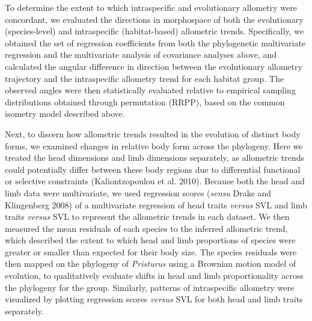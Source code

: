 \documentclass[
  11pt,
]{article}
\begin{document}
To determine the extent to which intraspecific and evolutionary
allometry were concordant, we evaluated the directions in morphospace of
both the evolutionary (species-level) and intraspecific (habitat-based)
allometric trends. Specifically, we obtained the set of regression
coefficients from both the phylogenetic multivariate regression and the
multivariate analysis of covariance analyses above, and calculated the
angular difference in direction between the evolutionary allometry
trajectory and the intraspecific allometry trend for each habitat group.
The observed angles were then statistically evaluated relative to
empirical sampling distributions obtained through permutation (RRPP),
based on the common isometry model described above. \hfill\break

Next, to discern how allometric trends resulted in the evolution of
distinct body forms, we examined changes in relative body form across
the phylogeny. Here we treated the head dimensions and limb dimensions
separately, as allometric trends could potentially differ between these
body regions due to differential functional or selective constraints
(Kaliontzopoulou et al. 2010). Because both the head and limb data were
multivariate, we used regression scores (\emph{sensu} Drake and
Klingenberg 2008) of a multivariate regression of head traits
\emph{versus} SVL and limb traits \emph{versus} SVL to represent the
allometric trends in each dataset. We then measured the mean residuals
of each species to the inferred allometric trend, which described the
extent to which head and limb proportions of species were greater or
smaller than expected for their body size. The species residuals were
then mapped on the phylogeny of \emph{Pristurus} using a Brownian motion
model of evolution, to qualitatively evaluate shifts in head and limb
proportionality across the phylogeny for the group. Similarly, patterns
of intraspecific allometry were visualized by plotting regression scores
\emph{versus} SVL for both head and limb traits separately. \hfill\break
\end{document}
